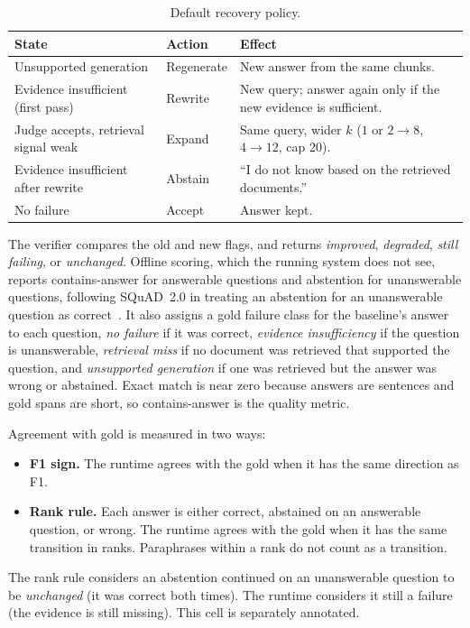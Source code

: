 \documentclass[12pt, a4paper, oneside]{report}
\begin{document}
\begin{table}[htbp]
\centering
\small
\begin{tabular}{@{}p{4.4cm}p{2.2cm}p{7.2cm}@{}}
\toprule
State & Action & Effect \\
\midrule
Unsupported generation & Regenerate & New answer from the same chunks. \\
Evidence insufficient (first pass) & Rewrite & New query; answer again only
if the new evidence is sufficient. \\
Judge accepts, retrieval signal weak & Expand & Same query, wider $k$
($1$ or $2 \to 8$, $4 \to 12$, cap 20). \\
Evidence insufficient after rewrite & Abstain & ``I do not know based on
the retrieved documents.'' \\
No failure & Accept & Answer kept. \\
\bottomrule
\end{tabular}
\caption{Default recovery policy.}
\label{tbl:actions}
\end{table}

The verifier compares the old and new flags, and returns \emph{improved},
\emph{degraded}, \emph{still failing}, or \emph{unchanged}. Offline scoring, which
the running system does not see, reports contains-answer for answerable
questions and abstention for unanswerable questions, following SQuAD~2.0 in
treating an abstention for an unanswerable question as
correct~\cite{rajpurkar2018squad}. It also assigns a gold failure class for
the baseline's answer to each question, \emph{no failure} if it was correct,
\emph{evidence insufficiency} if the question is unanswerable,
\emph{retrieval miss} if no document was retrieved that supported the
question, and \emph{unsupported generation} if one was retrieved but the
answer was wrong or abstained. Exact match is near zero because answers are
sentences and gold spans are short, so contains-answer is the quality
metric.

Agreement with gold is measured in two ways:
\begin{itemize}
\item \textbf{F1 sign.} The runtime agrees with the gold when it has the
  same direction as F1.
\item \textbf{Rank rule.} Each answer is either correct, abstained on an
  answerable question, or wrong. The runtime agrees with the gold when it
  has the same transition in ranks. Paraphrases within a rank do not count
  as a transition.
\end{itemize}
The rank rule considers an abstention continued on an unanswerable question
to be \emph{unchanged} (it was correct both times). The runtime considers it
still a failure (the evidence is still missing). This cell is separately
annotated.
\end{document}

